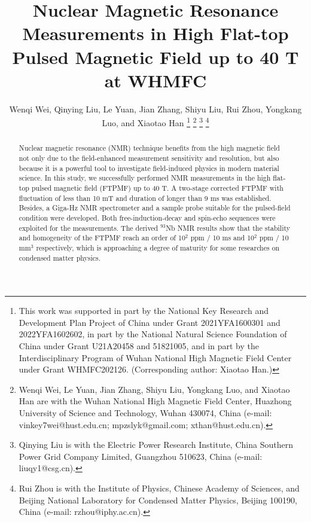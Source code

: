 \documentclass[lettersize,journal]{IEEEtran}
\begin{document}
\title{Nuclear Magnetic Resonance Measurements in High Flat-top Pulsed Magnetic Field up to 40 T at WHMFC}

\author{Wenqi Wei, Qinying Liu, Le Yuan, Jian Zhang, Shiyu Liu, Rui Zhou, Yongkang Luo, and Xiaotao Han
\thanks{This work was supported in part by the National Key Research and Development Plan Project of China under Grant 2021YFA1600301 and 2022YFA1602602, in part by the National Natural Science Foundation of China under Grant U21A20458 and 51821005, and in part by the Interdisciplinary Program of Wuhan National High Magnetic Field Center under Grant WHMFC202126. (Corresponding author: Xiaotao Han.)}
\thanks{Wenqi Wei, Le Yuan, Jian Zhang, Shiyu Liu, Yongkang Luo, and Xiaotao Han are with the Wuhan National High Magnetic Field Center, Huazhong University of Science and Technology, Wuhan 430074, China (e-mail: vinkey7wei@hust.edu.cn; mpzslyk@gmail.com; xthan@hust.edu.cn).}%
\thanks{Qinying Liu is with the Electric Power Research Institute, China Southern Power Grid Company Limited, Guangzhou 510623, China (e-mail: liuqy1@csg.cn).}%
\thanks{Rui Zhou is with the Institute of Physics, Chinese Academy of Sciences, and Beijing National Laboratory for Condensed Matter Physics, Beijing 100190, China (e-mail: rzhou@iphy.ac.cn).}}


\maketitle

\begin{abstract}
Nuclear magnetic resonance (NMR) technique benefits from the high magnetic field not only due to the field-enhanced measurement sensitivity and resolution, but also because it is a powerful tool to investigate field-induced physics in modern material science. In this study, we successfully performed NMR measurements in the high flat-top pulsed magnetic field (FTPMF) up to 40 T. A two-stage corrected FTPMF with fluctuation of less than 10 mT and duration of longer than 9 ms was established. Besides, a Giga-Hz NMR spectrometer and a sample probe suitable for the pulsed-field condition were developed. Both free-induction-decay and spin-echo sequences were exploited for the measurements. The derived $^{93}$Nb NMR results show that the stability and homogeneity of the FTPMF reach an order of 10$^2$ ppm / 10 ms and 10$^2$ ppm / 10 mm$^3$ respectively, which is approaching a degree of maturity for some researches on condensed matter physics.
\end{abstract}
\end{document}
